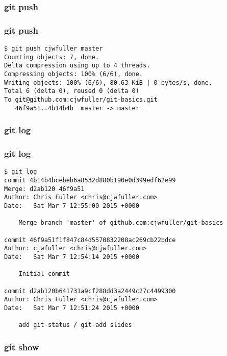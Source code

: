 \documentclass{beamer}
\begin{document}

\begin{frame}
\frametitle{git push}

\end{frame}


\begin{frame}[fragile]
\frametitle{git push}
	\scriptsize
	\begin{verbatim}
$ git push cjwfuller master
Counting objects: 7, done.
Delta compression using up to 4 threads.
Compressing objects: 100% (6/6), done.
Writing objects: 100% (6/6), 80.63 KiB | 0 bytes/s, done.
Total 6 (delta 0), reused 0 (delta 0)
To git@github.com:cjwfuller/git-basics.git
   46f9a51..4b14b4b  master -> master
	\end{verbatim}
\end{frame}


\begin{frame}
\frametitle{git log}

\end{frame}


\begin{frame}[fragile]
\frametitle{git log}
	\scriptsize
	\begin{verbatim}
$ git log
commit 4b14b4bcebeb6a8532d880b190e0d399edf62e99
Merge: d2ab120 46f9a51
Author: Chris Fuller <chris@cjwfuller.com>
Date:   Sat Mar 7 12:55:00 2015 +0000

    Merge branch 'master' of github.com:cjwfuller/git-basics

commit 46f9a51f1f847c84d5570832208ac269cb22bdce
Author: cjwfuller <chris@cjwfuller.com>
Date:   Sat Mar 7 12:54:14 2015 +0000

    Initial commit

commit d2ab120b641731a9cf288dd3a2449c27c4499300
Author: Chris Fuller <chris@cjwfuller.com>
Date:   Sat Mar 7 12:51:24 2015 +0000

    add git-status / git-add slides
	\end{verbatim}
\end{frame}



\begin{frame}
\frametitle{git show}

\end{frame}
\end{document}
